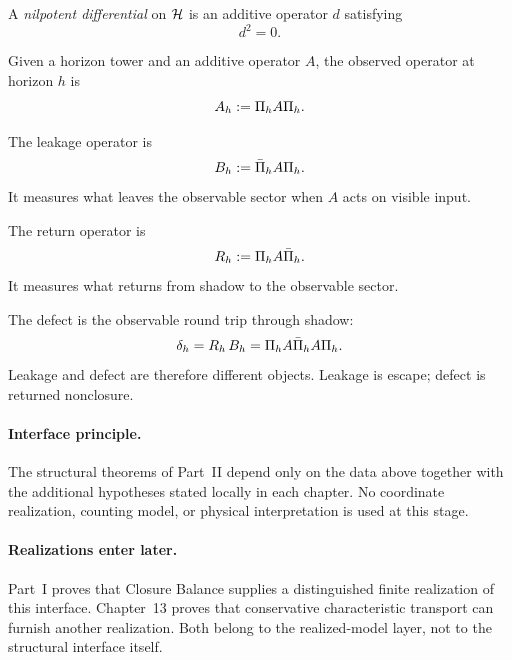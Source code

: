 \begin{definition}
\label{def:nilpotent-differential}
A \emph{nilpotent differential} on $\cH$ is an additive operator $d$ satisfying
\[
d^2=0.
\]
\end{definition}

\begin{definition}
\label{def:observed-operator}
Given a horizon tower and an additive operator $A$, the observed operator at
horizon $h$ is
\[
\CCObs{A}{h}:=\CCPi{h}A\CCPi{h}.
\]
\end{definition}

\begin{definition}
\label{def:leakage-operator}
The leakage operator is
\[
\CCLeak{A}{h}:=\CCPibar{h}A\CCPi{h}.
\]
It measures what leaves the observable sector when $A$ acts on visible input.
\end{definition}

\begin{definition}
\label{def:return-operator}
The return operator is
\[
R_h:=\CCPi{h}A\CCPibar{h}.
\]
It measures what returns from shadow to the observable sector.
\end{definition}

\begin{remark}
\label{rem:defect-round-trip}
The defect is the observable round trip through shadow:
\[
\CCDefect{A}{h}=R_h\,\CCLeak{A}{h}
=\CCPi{h}A\CCPibar{h}A\CCPi{h}.
\]
Leakage and defect are therefore different objects. Leakage is escape;
defect is returned nonclosure.
\end{remark}

\paragraph{Interface principle.}
The structural theorems of Part~II depend only on the data above together with
the additional hypotheses stated locally in each chapter. No coordinate
realization, counting model, or physical interpretation is used at this stage.

\paragraph{Realizations enter later.}
Part~I proves that Closure Balance supplies a distinguished finite
realization of this interface. Chapter~13 proves that conservative
characteristic transport can furnish another realization. Both belong to the
realized-model layer, not to the structural interface itself.
